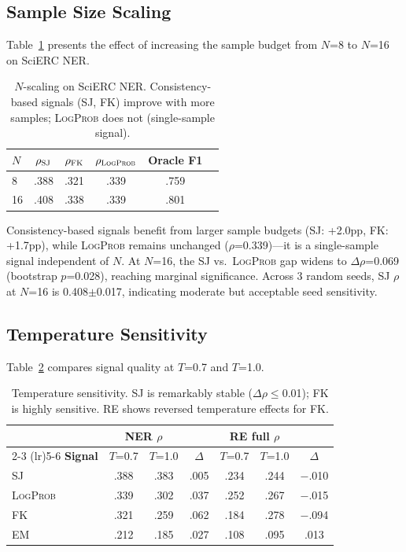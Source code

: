 \documentclass[11pt,a4paper]{article}
\newcommand{\SJ}{\textsc{SJ}}
\newcommand{\FK}{\textsc{FK}}
\newcommand{\LP}{\textsc{LogProb}}
\newcommand{\EM}{\textsc{EM}}
\begin{document}
\subsection{Sample Size Scaling}
\label{sec:nscaling}

Table~\ref{tab:nscaling} presents the effect of increasing the sample budget from $N$=8 to $N$=16 on SciERC NER.

\begin{table}[t]
\centering
\small
\begin{tabular}{l ccc cc}
\toprule
$N$ & $\rho_{\SJ{}}$ & $\rho_{\FK{}}$ & $\rho_{\LP{}}$ & Oracle F1 \\
\midrule
8 & .388 & .321 & .339 & .759 \\
16 & .408 & .338 & .339 & .801 \\
\bottomrule
\end{tabular}
\caption{$N$-scaling on SciERC NER. Consistency-based signals (\SJ{}, \FK{}) improve with more samples; \LP{} does not (single-sample signal).}
\label{tab:nscaling}
\end{table}

Consistency-based signals benefit from larger sample budgets (\SJ{}: +2.0pp, \FK{}: +1.7pp), while \LP{} remains unchanged ($\rho$=0.339)---it is a single-sample signal independent of $N$.
At $N$=16, the \SJ{} vs.\ \LP{} gap widens to $\Delta\rho$=0.069 (bootstrap $p$=0.028), reaching marginal significance.
Across 3 random seeds, \SJ{} $\rho$ at $N$=16 is 0.408$\pm$0.017, indicating moderate but acceptable seed sensitivity.

\subsection{Temperature Sensitivity}
\label{sec:temperature}

Table~\ref{tab:temperature} compares signal quality at $T$=0.7 and $T$=1.0.

\begin{table}[t]
\centering
\small
\begin{tabular}{l cc c cc c}
\toprule
& \multicolumn{2}{c}{\textbf{NER} $\rho$} & & \multicolumn{2}{c}{\textbf{RE full} $\rho$} \\
\cmidrule(lr){2-3} \cmidrule(lr){5-6}
\textbf{Signal} & $T$=0.7 & $T$=1.0 & $\Delta$ & $T$=0.7 & $T$=1.0 & $\Delta$ \\
\midrule
\SJ{} & .388 & .383 & .005 & .234 & .244 & $-$.010 \\
\LP{} & .339 & .302 & .037 & .252 & .267 & $-$.015 \\
\FK{} & .321 & .259 & .062 & .184 & .278 & $-$.094 \\
\EM{} & .212 & .185 & .027 & .108 & .095 & .013 \\
\bottomrule
\end{tabular}
\caption{Temperature sensitivity. \SJ{} is remarkably stable ($\Delta\rho \leq$0.01); \FK{} is highly sensitive. RE shows reversed temperature effects for \FK{}.}
\label{tab:temperature}
\end{table}
\end{document}
